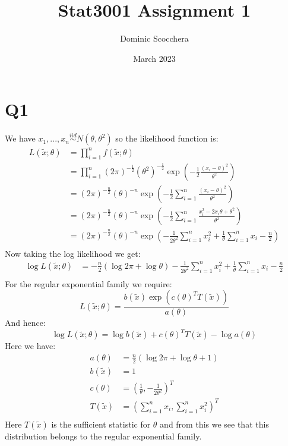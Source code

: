 \documentclass{article}
\title{Stat3001 Assignment 1}
\author{Dominic Scocchera}
\date{March 2023}
\begin{document}
\maketitle
\section*{Q1}
We have $x_1,...,x_n\stackrel{iid}{\sim}N(\theta,\theta^2)$ so the likelihood function is:
\begin{align*}
L(\tilde{x};\theta)&=\prod_{i=1}^{n}f(\tilde{x};\theta)\\
&=\prod_{i=1}^{n}(2\pi)^{-\frac{1}{2}}(\theta^2)^{-\frac{1}{2}}\exp\left(-\frac{1}{2}\frac{(x_i-\theta)^2}{\theta^2}\right)\\
&=(2\pi)^{-\frac{n}{2}}(\theta)^{-n}\exp\left(-\frac{1}{2}\sum_{i=1}^{n}\frac{(x_i-\theta)^2}{\theta^2}\right)\\
&=(2\pi)^{-\frac{n}{2}}(\theta)^{-n}\exp\left(-\frac{1}{2}\sum_{i=1}^{n}\frac{x_i^2-2x_i\theta+\theta^2}{\theta^2}\right)\\
&=(2\pi)^{-\frac{n}{2}}(\theta)^{-n}\exp\left(-\frac{1}{2\theta^2}\sum_{i=1}^{n}x_i^2+\frac{1}{\theta}\sum_{i=1}^{n}x_i-\frac{n}{2}\right)\\
\end{align*}
Now taking the log likelihood we get:
\begin{align*}
\log L(\tilde{x};\theta)&=-\frac{n}{2}\left(\log 2\pi +\log\theta\right)-\frac{1}{2\theta^2}\sum_{i=1}^{n}x_i^2+\frac{1}{\theta}\sum_{i=1}^{n}x_i-\frac{n}{2}\\
\end{align*}
For the regular exponential family we require:
$$L(\tilde{x};\theta)=\frac{b(\tilde{x})\exp(c(\theta)^TT(\tilde{x}))}{a(\theta)}$$
And hence:
$$\log L(\tilde{x};\theta)=\log b(\tilde{x})+c(\theta)^TT(\tilde{x})-\log a(\theta)$$
Here we have:
\begin{align*}
a(\theta)&=\frac{n}{2}(\log2\pi+\log\theta+1)\\
b(\tilde{x})&=1\\
c(\theta)&=\left(\frac{1}{\theta},-\frac{1}{2\theta^2}\right)^T\\
T(\tilde{x})&=\left(\sum_{i=1}^{n}x_i,\sum_{i=1}^{n}x_i^2\right)^T\\
\end{align*}
Here $T(\tilde{x})$ is the sufficient statistic for $\theta$ and from this we see that this distribution belongs to the regular exponential family.
\end{document}
